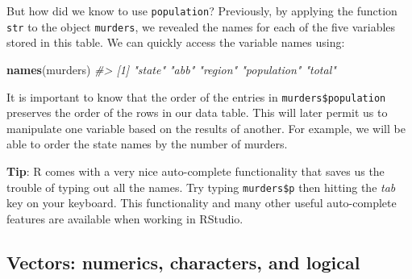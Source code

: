 \documentclass[
]{krantz}
\newenvironment{Shaded}{\begin{snugshade}}{\end{snugshade}}
\newcommand{\CommentTok}[1]{\textcolor[rgb]{0.37,0.37,0.37}{\textit{#1}}}
\newcommand{\KeywordTok}[1]{\textcolor[rgb]{0.27,0.27,0.27}{\textbf{#1}}}
\newcommand{\NormalTok}[1]{#1}
\newcommand{\OperatorTok}[1]{\textcolor[rgb]{0.43,0.43,0.43}{\textbf{#1}}}
\begin{document}
\begin{Shaded}
\end{Shaded}

But how did we know to use \texttt{population}? Previously, by applying the function \texttt{str} to the object \texttt{murders}, we revealed the names for each of the five variables stored in this table. We can quickly access the variable names using:

\begin{Shaded}
\begin{Highlighting}[]
\KeywordTok{names}\NormalTok{(murders)}
\CommentTok{#> [1] "state"      "abb"        "region"     "population" "total"}
\end{Highlighting}
\end{Shaded}

It is important to know that the order of the entries in \texttt{murders\$population} preserves the order of the rows in our data table. This will later permit us to manipulate one variable based on the results of another. For example, we will be able to order the state names by the number of murders.

\textbf{Tip}: R comes with a very nice auto-complete functionality that saves us the trouble of typing out all the names. Try typing \texttt{murders\$p} then hitting the \emph{tab} key on your keyboard. This functionality and many other useful auto-complete features are available when working in RStudio.

\hypertarget{vectors-numerics-characters-and-logical}{%
\subsection{Vectors: numerics, characters, and logical}\label{vectors-numerics-characters-and-logical}}
\end{document}
